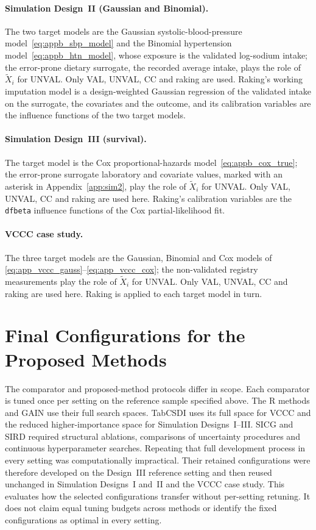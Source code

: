 \paragraph{Simulation Design~II (Gaussian and Binomial).} The two target models are the Gaussian systolic-blood-pressure model~\eqref{eq:appb_sbp_model} and the Binomial hypertension model~\eqref{eq:appb_htn_model}, whose exposure is the validated log-sodium intake; the error-prone dietary surrogate, the recorded average intake, plays the role of $\tilde{X}_i$ for UNVAL. Only VAL, UNVAL, CC and raking are used. Raking's working imputation model is a design-weighted Gaussian regression of the validated intake on the surrogate, the covariates and the outcome, and its calibration variables are the influence functions of the two target models.

\paragraph{Simulation Design~III (survival).} The target model is the Cox proportional-hazards model~\eqref{eq:appb_cox_true}; the error-prone surrogate laboratory and covariate values, marked with an asterisk in Appendix~\ref{app:sim2}, play the role of $\tilde{X}_i$ for UNVAL. Only VAL, UNVAL, CC and raking are used here. Raking's calibration variables are the \texttt{dfbeta} influence functions of the Cox partial-likelihood fit.

\paragraph{VCCC case study.} The three target models are the Gaussian, Binomial and Cox models of \eqref{eq:app_vccc_gauss}--\eqref{eq:app_vccc_cox}; the non-validated registry measurements play the role of $\tilde{X}_i$ for UNVAL. Only VAL, UNVAL, CC and raking are used here. Raking is applied to each target model in turn.

\section{Final Configurations for the Proposed Methods}
\label{app:proposed_config}

The comparator and proposed-method protocols differ in scope. Each comparator is tuned once per setting on the reference sample specified above. The R methods and GAIN use their full search spaces. TabCSDI uses its full space for VCCC and the reduced higher-importance space for Simulation Designs~I--III. SICG and SIRD required structural ablations, comparisons of uncertainty procedures and continuous hyperparameter searches. Repeating that full development process in every setting was computationally impractical. Their retained configurations were therefore developed on the Design~III reference setting and then reused unchanged in Simulation Designs~I and~II and the VCCC case study. This evaluates how the selected configurations transfer without per-setting retuning. It does not claim equal tuning budgets across methods or identify the fixed configurations as optimal in every setting.


